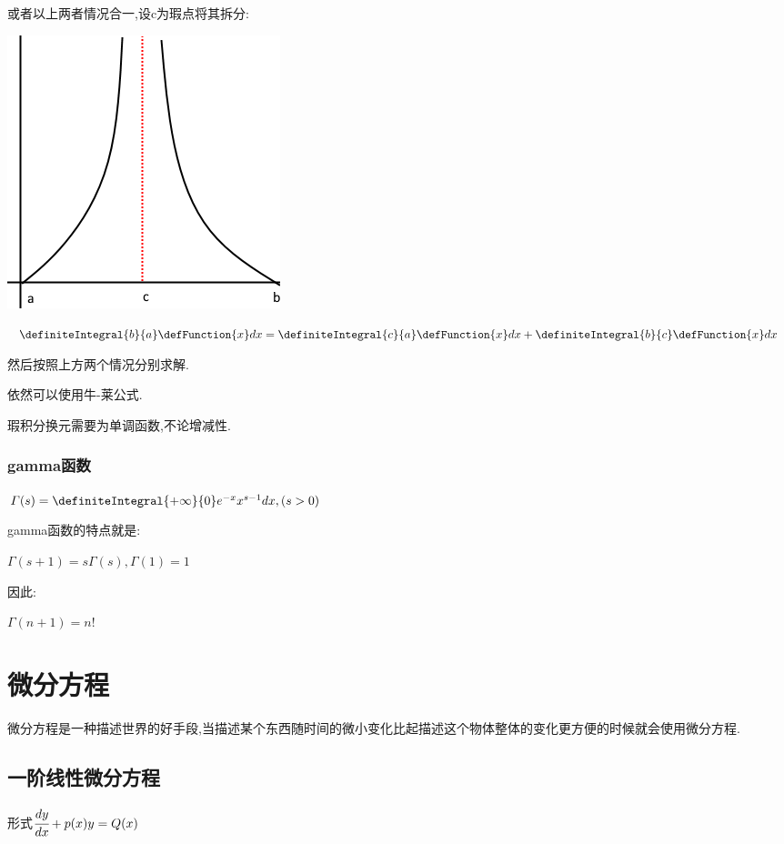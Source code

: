 {{{{  或者以上两者情况合一,设c为瑕点将其拆分:

  \begin{center}
    \includegraphics{resources/infityFunctionUnormalIntegral3.png}
  \end{center}

  $\definiteIntegral{b}{a}\defFunction{x}dx = \definiteIntegral{c}{a}\defFunction{x}dx + \definiteIntegral{b}{c}\defFunction{x}dx$

  然后按照上方两个情况分别求解.

  依然可以使用牛-莱公式.

  瑕积分换元需要为单调函数,不论增减性.

}%

\subsubsection{gamma函数}{
$\varGamma(s) = \definiteIntegral{+\infty}{0}e^{-x}x^{s-1}dx, (s > 0)$

gamma函数的特点就是:

$\varGamma(s + 1) = s\varGamma(s), \varGamma(1) = 1$

因此:

$\varGamma(n+1) = n!$

}%

}%

}%

\section{微分方程}{
微分方程是一种描述世界的好手段,当描述某个东西随时间的微小变化比起描述这个物体整体的变化更方便的时候就会使用微分方程.

\subsection{一阶线性微分方程}{
  形式$\cfrac{dy}{dx} + p(x)y = Q(x)$

}}}
